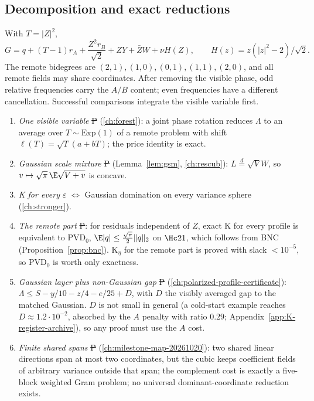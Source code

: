 \subsection{Decomposition and exact reductions}
With $T=|Z|^2$,
\[
 G=q+(T-1)r_A+\frac{Z^2r_B}{\sqrt2}+ZY+\bar ZW+\nu H(Z),\qquad H(z)=z(|z|^2-2)/\sqrt2 .
\]
The remote bidegrees are $(2,1),(1,0),(0,1),(1,1),(2,0)$, and all remote fields may share coordinates. After removing the visible phase, odd relative frequencies carry the
$A/B$ content; even frequencies have a different cancellation. Successful comparisons integrate the visible variable first.
\begin{enumerate}
\item \emph{One visible variable} \st{P} (\autoref{ch:forest}): a joint phase rotation reduces $\Lambda$ to an average over $T\sim\mathrm{Exp}(1)$ of a remote problem
with shift $\ell(T)=\sqrt T(a+bT)$; the price identity is exact.
\item \emph{Gaussian scale mixture} \st{P} (Lemma~\ref{lem:gsm}, \autoref{ch:rescub}): $L\overset d=\sqrt VW$, so $v\mapsto\sqrt\pi\,\E\sqrt{V+v}$ is concave.
\item \emph{K for every $\varepsilon$} $\iff$ Gaussian domination on every variance sphere (\autoref{ch:stronger}).
\item \emph{The remote part} \st{P}: for residuals independent of $Z$, exact K for every profile is equivalent to PVD$_0$, $\E|q|\le\frac{\sqrt\pi}2\|q\|_2$ on $\Hc21$,
which follows from BNC (Proposition~\ref{prop:bnc}). K$_\eta$ for the remote part is proved with slack $<10^{-5}$, so PVD$_0$ is worth only exactness.
\item \emph{Gaussian layer plus non-Gaussian gap} \st{P} (\autoref{ch:polarized-profile-certificate}): $\Lambda\le S-y/10-z/4-e/25+D$, with $D$ the visibly
averaged gap to the matched Gaussian. $D$ is not small in general (a cold-start example reaches $D\approx1.2\cdot10^{-2}$, absorbed by the $A$ penalty with ratio
$0.29$; Appendix~\ref{app:K-register-archive}), so any proof must use the $A$ cost.
\item \emph{Finite shared spans} \st{P} (\autoref{ch:milestone-map-20261020}): two shared linear directions span at most two coordinates, but the cubic keeps
coefficient fields of arbitrary variance outside that span; the complement cost is exactly a five-block weighted Gram problem; no universal dominant-coordinate reduction
exists.
\end{enumerate}

